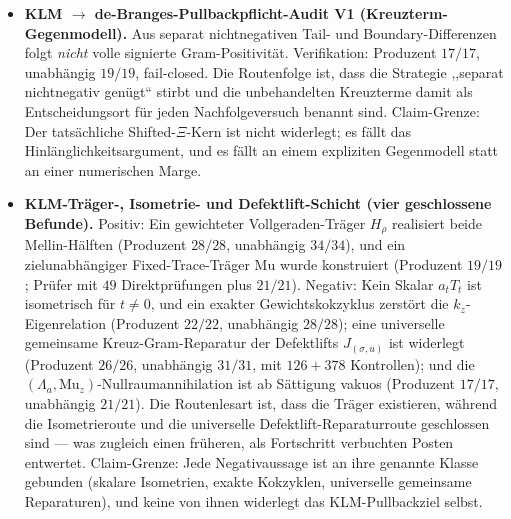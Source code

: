 \documentclass[12pt,a4paper]{article}
\theoremstyle{definition}
\theoremstyle{remark}
\begin{document}
\begin{itemize}
  \item \textbf{KLM $\to$ de-Branges-Pull\-back\-pflicht-Audit V1
    (Kreuz\-term-Gegen\-modell).} Aus separat nichtnegativen Tail- und
    Boundary-Differenzen folgt \emph{nicht} volle signierte
    Gram-Positivität. Verifikation: Produzent $17/17$, unabhängig $19/19$,
    fail-closed. Die Routenfolge ist, dass die Strategie ,,separat
    nichtnegativ genügt`` stirbt und die unbehandelten Kreuzterme damit als
    Ent\-schei\-dungs\-ort für jeden Nach\-folge\-versuch benannt sind.
    Claim-Grenze: Der tatsächliche Shifted-$\Xi$-Kern ist nicht widerlegt;
    es fällt das Hin\-läng\-lich\-keits\-argument, und es fällt an einem
    expliziten Gegenmodell statt an einer numerischen Marge.

  \item \textbf{KLM-Träger-, Isometrie- und Defektlift-Schicht (vier
    geschlossene Befunde).} Positiv: Ein gewichteter Vollgeraden-Träger
    $H_\rho$ realisiert beide Mellin-Hälften (Produzent $28/28$,
    unabhängig $34/34$), und ein zielunabhängiger Fixed-Trace-Träger
    $\mathrm{Mu}$ wurde konstruiert (Produzent $19/19$; Prüfer mit $49$
    Direktprüfungen plus $21/21$). Negativ: Kein Skalar $a_t T_t$ ist
    isometrisch für $t \neq 0$, und ein exakter Gewichtskokzyklus zerstört
    die $k_z$-Eigenrelation (Produzent $22/22$, unabhängig $28/28$); eine
    universelle gemeinsame Kreuz-Gram-Reparatur der Defektlifts
    $J_{(\sigma,u)}$ ist widerlegt (Produzent $26/26$, unabhängig $31/31$,
    mit $126+378$ Kontrollen); und die
    $(\Lambda_a, \mathrm{Mu}_z)$-Nullraumannihilation ist ab Sättigung
    vakuos (Produzent $17/17$, unabhängig $21/21$). Die Routenlesart ist,
    dass die Träger existieren, während die Isometrieroute und die
    universelle Defektlift-Reparaturroute geschlossen sind --- was zugleich
    einen früheren, als Fortschritt verbuchten Posten entwertet.
    Claim-Grenze: Jede Negativaussage ist an ihre genannte Klasse gebunden
    (skalare Isometrien, exakte Kokzyklen, universelle gemeinsame
    Reparaturen), und keine von ihnen widerlegt das KLM-Pullbackziel
    selbst.


\end{itemize}
\end{document}
